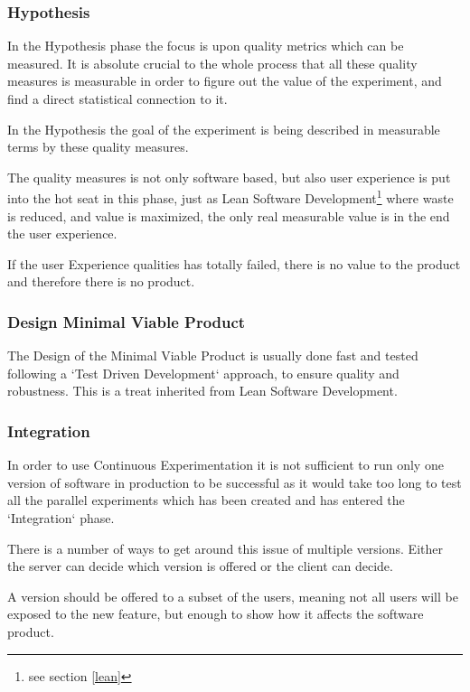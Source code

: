 \documentclass{sig-alternate}
\begin{document}
\subsubsection{Hypothesis}
\label{cx:hypothesis}
In the Hypothesis phase the focus is upon quality metrics which can be measured.
It is absolute crucial to the whole process that all these quality measures is measurable in order to figure 
out the value of the experiment, and find a direct statistical connection to it. 

In the Hypothesis the goal of the experiment is being described in measurable terms 
by these quality measures. 

The quality measures is not only software based, but also user experience is put into the hot seat in this 
phase, just as Lean Software Development\footnote{\label{see-lean}see section \ref{lean}} where waste 
is reduced, and value is maximized, the only real measurable value is in the end the user experience. 

If the user Experience qualities has totally failed, there is no value to the product and therefore there is 
no product.

\subsubsection{Design Minimal Viable Product}
\label{cx:design}
The Design of the Minimal Viable Product is usually done fast and tested following a `Test Driven Development`
approach, to ensure quality and robustness. 
This is a treat inherited from Lean Software Development\footnotemark[\ref{see-lean}].

\subsubsection{Integration}
\label{cx:integration}
In order to use Continuous Experimentation it is not sufficient to run only one version of software in 
production to be successful as it would take too long to test all the parallel experiments which has been
created and has entered the `Integration` phase. 

There is a number of ways to get around this issue of multiple versions. 
Either the server can decide which version is offered or the client can decide.

A version should be offered to a subset of the users, meaning not all users will be exposed to the 
new feature, but enough to show how it affects the software product.
\end{document}
